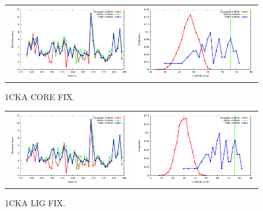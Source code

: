 \documentclass[a4paper,12pt]{article}
\begin{document}
   \begin{figure}[t]
     \centering
     \begin{tabular}{cc}
       \includegraphics[width=8.45cm]{sedano_gen2/similarity_bypos.pdf} &
       \includegraphics[width=8.45cm]{sedano_gen2/similarity_byseq_frequency.pdf} \\
     \end{tabular}
     
     \caption{1CKA CORE FIX.}
     \label{fig-seqlogo-T=03}
   \end{figure}

   \begin{figure}[t]
     \centering
     \begin{tabular}{cc}
       \includegraphics[width=8.45cm]{sedano_gen4/similarity_bypos.pdf} &
       \includegraphics[width=8.45cm]{sedano_gen4/similarity_byseq_frequency.pdf} \\
     \end{tabular}
     
     \caption{1CKA LIG FIX.}
   \end{figure}
\end{document}
